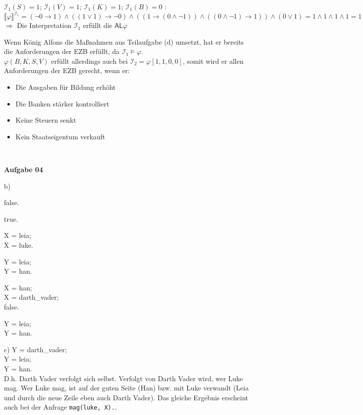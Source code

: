 \documentclass[a4paper,10pt]{article}
\begin{document}
\begin{compactenum}[(a)]
		\item $  \mathcal{I}_1(S)=1 $; $  \mathcal{I}_1(V)=1 $; $  \mathcal{I}_1(K)=1 $; $  \mathcal{I}_1(B)=0 $ : \\
		$\llbracket \varphi \rrbracket ^{ \mathcal{I}_1} = (\lnot 0 \rightarrow 1) \wedge ((1 \vee 1) \rightarrow \lnot 0) \wedge ((1 \rightarrow (0 \wedge \lnot 1)) \wedge ((0 \wedge \lnot 1) \rightarrow 1)) \wedge (0 \vee 1) = 1 \wedge 1 \wedge 1 \wedge 1 = 1$\\
		$\Longrightarrow$ Die Interpretation $\mathcal{I}_1$ erfüllt die $\mathsf{AL} \varphi$
		\item Wenn König Alfons die Maßnahmen aus Teilaufgabe (d) umsetzt, hat er bereits die Anforderungen der EZB erfüllt, da $\mathcal{I}_1 \models \varphi$. \\
		$ \varphi(B,K,S,V) $ erfüllt allerdings auch bei $\mathcal{I}_2 = \varphi[1,1,0,0]$, somit wird er allen Anforderungen der EZB gerecht, wenn er:
		\begin{itemize}
			\item Die Ausgaben für Bildung erhöht
			\item Die Banken stärker kontrolliert
			\item Keine Steuern senkt
			\item Kein Staatseigentum verkauft
		\end{itemize}
	\end{compactenum}\

	\textbf{Aufgabe 04}
	\begin{compactenum}
		\item [b)]
		\begin{compactenum}[i)]
			\item false.
			\item true.
			\item X = leia;\\
			X = luke.
			\item Y = leia;\\
			Y = han.
			\item X = han;\\
			X = darth\_vader;\\
			false.
			\item Y = leia;\\
			Y = han.
		\end{compactenum}
		\item [c)]
		Y = darth\_vader;\\
		Y = leia;\\
		Y = han.\\
		D.h. Darth Vader verfolgt sich selbst. Verfolgt von Darth Vader wird, wer Luke mag. Wer Luke mag, ist auf der guten Seite (Han) bzw. mit Luke verwandt (Leia und durch die neue Zeile eben auch Darth Vader). Das gleiche Ergebnis erscheint auch bei der Anfrage \verb|mag(luke, X).|.
	\end{compactenum}
\end{document}
